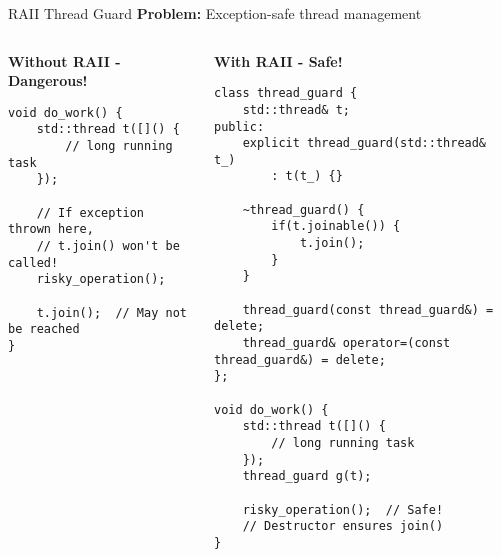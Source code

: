 \begin{frame}[fragile]{RAII Thread Guard}
	\textbf{Problem:} Exception-safe thread management

	\begin{columns}
		\begin{column}{0.5\textwidth}
			\textbf{Without RAII - Dangerous!}
			\begin{verbatim}
void do_work() {
    std::thread t([]() {
        // long running task
    });

    // If exception thrown here,
    // t.join() won't be called!
    risky_operation();

    t.join();  // May not be reached
}
			\end{verbatim}
		\end{column}
		\begin{column}{0.5\textwidth}
			\textbf{With RAII - Safe!}
			\begin{verbatim}
class thread_guard {
    std::thread& t;
public:
    explicit thread_guard(std::thread& t_)
        : t(t_) {}

    ~thread_guard() {
        if(t.joinable()) {
            t.join();
        }
    }

    thread_guard(const thread_guard&) = delete;
    thread_guard& operator=(const thread_guard&) = delete;
};

void do_work() {
    std::thread t([]() {
        // long running task
    });
    thread_guard g(t);

    risky_operation();  // Safe!
    // Destructor ensures join()
}
			\end{verbatim}
		\end{column}
	\end{columns}
\end{frame}

